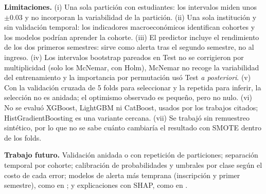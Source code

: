 \documentclass[conference]{IEEEtran}
\begin{document}
\textbf{Limitaciones.} (i) Una sola partición con \Nte{} estudiantes: los intervalos miden unos $\pm0.03$ y no incorporan la variabilidad de la partición. (ii) Una sola institución y sin validación temporal: los indicadores macroeconómicos identifican cohortes y los modelos podrían aprender la cohorte. (iii) El predictor incluye el rendimiento de los dos primeros semestres: sirve como alerta tras el segundo semestre, no al ingreso. (iv) Los intervalos bootstrap pareados en Test no se corrigieron por multiplicidad (solo los McNemar, con Holm), McNemar no recoge la variabilidad del entrenamiento \cite{dietterich1998} y la importancia por permutación usó Test \emph{a posteriori}. (v) Con la validación cruzada de 5 folds para seleccionar y la repetida para inferir, la selección no es anidada; el optimismo observado es pequeño, pero no nulo. (vi) No se evaluó XGBoost, LightGBM ni CatBoost, usados por los trabajos citados; HistGradientBoosting es una variante cercana. (vii) Se trabajó sin remuestreo sintético, por lo que no se sabe cuánto cambiaría el resultado con SMOTE dentro de los folds.

\textbf{Trabajo futuro.} Validación anidada o con repetición de particiones; separación temporal por cohorte; calibración de probabilidades y umbrales por clase según el costo de cada error; modelos de alerta más temprana (inscripción y primer semestre), como en \cite{martins2023}; y explicaciones con SHAP, como en \cite{praptomo2026}.

\end{document}
